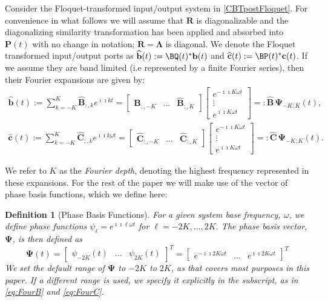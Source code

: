 \documentclass[pdflatex,sn-mathphys-num]{sn-jnl}%
\theoremstyle{thmstyleone}%
\theoremstyle{thmstyletwo}%
\theoremstyle{thmstylethree}%
\newtheorem{definition}{Definition}%
\def\Bb{{\bf b}}  \def\BB{{\bf B}}
\def\Bc{{\bf c}}  \def\BC{{\bf C}}
\def\ii{\dot{\imath\!\imath}}
\def\BPsi{{\boldsymbol{\Psi}}}
\def\Bhat{\widehat{\mathbf{B}}}
\def\bhat{\widehat{\mathbf{b}}}
\def\Chat{\widehat{\mathbf{C}}}
\def\chat{\widehat{\mathbf{c}}}
\begin{document}
Consider the Floquet-transformed input/output system in \eqref{CBTpostFloquet}. For convenience in what follows we will assume that $\mathbf{R}$ is diagonalizable and the diagonalizing similarity transformation has been applied and absorbed into $\mathbf{P}(t)$ with no change in notation; $\mathbf{R}=\boldsymbol{\Lambda}$ is diagonal.  We denote the Floquet transformed input/output ports as $\bhat(t):=\BQ(t)^{*}\Bb(t)$ and $\chat(t):=\BP(t)^*\Bc(t)$. If we assume they are band limited (i.e represented by a finite Fourier series), then their Fourier expansions are given by:   
 \begin{equation}
\label{eq:FourB}
\begin{aligned}
\bhat(t):=\sum_{k=-K}^K \Bhat_{:,k} e^{\ii k t} =\begin{bmatrix}
    \Bhat_{:,-K} & \dots & \Bhat_{:,K}
\end{bmatrix}
\begin{bmatrix}
    e^{-\ii K\omega t} \\
    \vdots \\
    e^{\ii K\omega t}
\end{bmatrix}=:
\Bhat\, \BPsi_{-K:K}(t),
\end{aligned}
\end{equation}
\begin{equation}
\label{eq:FourC}
\begin{aligned}
\chat(t):=\sum_{k=-K}^K \Chat_{:,k} e^{\ii k\omega t}=\begin{bmatrix}
    \Chat_{:,-K} & \dots & {\Chat}_{:,K}
\end{bmatrix}
\begin{bmatrix}
    e^{-\ii K\omega t} \\
    \vdots \\
    e^{\ii K\omega t}
\end{bmatrix}
=:
{\Chat}\,\BPsi_{-K:K}(t).
\end{aligned}
\end{equation}

We refer to $K$ as the \emph{Fourier depth}, denoting the highest frequency represented in these expansions. For the rest of the paper we will make use of the vector of phase basis functions, which we define here:
\begin{definition}[Phase Basis Functions]\label{def:psi}
    For a given system base frequency, $\omega$, we define phase functions  $\psi_\ell = e^{\ii \ell \omega t}$ for $\ell=-2K,\ldots,2K$. The \emph{phase basis vector}, $\BPsi$, is then defined as 
    \begin{equation}
        \BPsi(t) = \begin{bmatrix}
            \psi_{-2K}(t) & \hdots & \psi_{2K}(t)
        \end{bmatrix}^T = \begin{bmatrix}
            e^{-\ii 2K\omega t} & \hdots & e^{\ii 2K\omega t}
        \end{bmatrix}^T
    \end{equation}
    We set the default range of $\BPsi$ to $-2K$ to $2K$, as that covers most purposes in this paper. If a different range is used, we specify it explicitly in the subscript, as in \eqref{eq:FourB} and \eqref{eq:FourC}.    
\end{definition}
\end{document}
